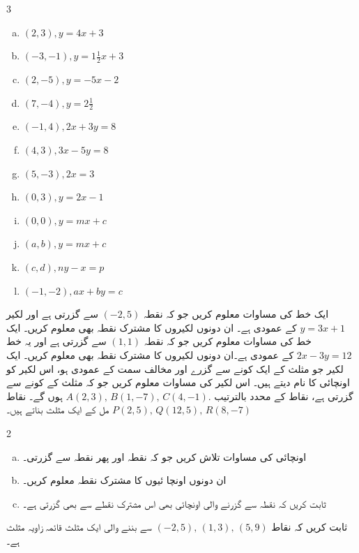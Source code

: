 \begin{multicols}{3}
\begin{enumerate}[a.]
\item \((2,3),  y=4x+3 \)
\item \((-3,-1), y=1\frac{1}{2}x+3 \)
\item \((2,-5),   y=-5x-2 \)
\item \((7,-4), y=2\frac{1}{2} \)
\item \((-1,4),  2x+3y=8 \)
\item \((4,3),  3x-5y=8 \)
\item \((5,-3),   2x=3 \)
\item \((0,3),   y=2x-1 \)
\item \((0,0),  y=mx+c \)
\item \((a,b),  y=mx+c \)
\item \((c,d),  ny-x=p \)
\item \((-1,-2), ax+by=c \)
\end{enumerate}
\end{multicols}
ایک خط کی مساوات معلوم کریں جو کہ نقطہ \( (-2,5) \)  سے گزرتی ہے اور لکیر  \( y=3x+1 \)  کے عمودی ہے۔ ان دونوں لکیروں کا مشترک نقطہ بھی معلوم کریں۔
ایک خط کی مساوات معلوم کریں جو کہ نقطہ \( (1,1) \)  سے گزرتی ہے اور یہ خط \( 2x-3y=12 \) کے عمودی ہے۔ان دونوں لکیروں کا مشترک نقطہ بھی معلوم کریں۔             
ایک لکیر جو مثلث کے ایک کونے سے گزرے اور مخالف سمت کے عمودی ہو، اس لکیر کو اونچائی کا نام دیتے ہیں۔  اس لکیر کی مساوات معلوم کریں جو کہ مثلث  کے  کونے  سے گزرتی ہے، نقاط کے محدد بالترتیب \( A(2,3), \, B(1,-7), \, C(4,-1). \) ہوں گے۔
نقاط \( P(2,5), \, Q(12,5), \, R(8,-7) \) مل کے ایک مثلث بناتے ہیں۔
\begin{multicols}{2}
\begin{enumerate}[a.]
\item
اونچائی کی مساوات تلاش کریں جو کہ نقطہ  اور پھر نقطہ  سے گزرتی۔  
\item
ان دونوں اونچا ئیوں کا مشترک نقطہ معلوم کریں۔
\item
ثابت کریں کہ نقطہ  سے گزرنے والی اونچائی بھی اس مشترک نقطے سے بھی گزرتی ہے۔ 
\end{enumerate}
\end{multicols}
ثابت کریں کہ نقاط \( (-2,5) , \, (1,3), \, (5,9) \) سے بننے والی ایک مثلث قائمہ زاویہ مثلث ہے۔
